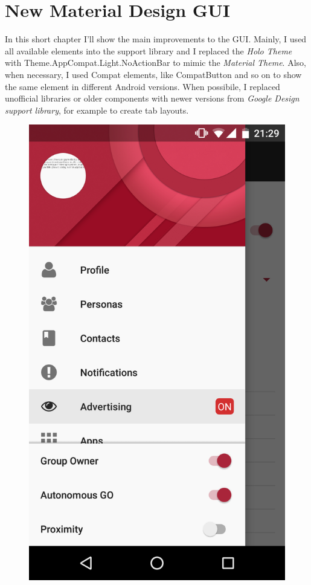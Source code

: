 \chapter{New Material Design GUI}
\label{gui}

In this short chapter I'll show the main improvements to the GUI.
Mainly, I used all available elements into the support library and I replaced the \emph{Holo Theme} with \textsf{Theme.AppCompat.Light.NoActionBar} to mimic the \emph{Material Theme}. Also, when necessary, I used \textsf{Compat} elements, like \textsf{CompatButton} and so on to show the same element in different Android versions. When possibile, I replaced unofficial libraries or older components with newer versions from \emph{Google Design support library}, for example to create tab layouts. 

\begin{figure}[thpb]
\centering
\begin{minipage}[b]{0.4\textwidth}
	\centering
	\includegraphics[scale=0.1]{./images/chap3/drawer.png}

\end{minipage}
\end{figure}
